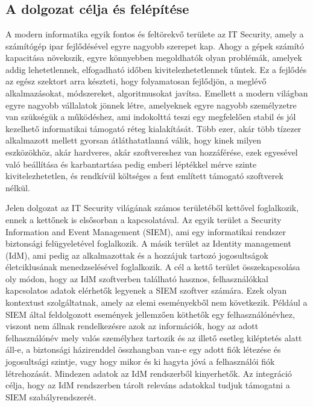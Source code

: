 \chapter{\bevezetes}
\label{ch:bev}
\selecthungarian

\section{A dolgozat célja és felépítése }
A modern informatika egyik fontos és feltörekvő területe az IT Security, amely a számítógép ipar fejlődésével egyre nagyobb szerepet kap. Ahogy a gépek számító kapacitása növekszik, egyre könnyebben megoldhatók olyan problémák, amelyek addig lehetetlennek, elfogadható időben kivitelezhetetlennek tűntek. Ez a fejlődés az egész szektort arra készteti, hogy folyamatosan fejlődjön, a meglévő alkalmazásokat, módszereket, algoritmusokat javítsa. Emellett a modern világban egyre nagyobb vállalatok jönnek létre, amelyeknek egyre nagyobb személyzetre van szükségük a működéshez, ami indokolttá teszi egy megfelelően stabil és jól kezelhető informatikai támogató réteg kialakítását. Több ezer, akár több tízezer alkalmazott mellett gyorsan átláthatatlanná válik, hogy kinek milyen eszközökhöz, akár hardveres, akár szoftvereshez van hozzáférése, ezek egyesével való beállítása és karbantartása pedig emberi léptékkel mérve szinte kivitelezhetetlen, és rendkívül költséges a fent említett támogató szoftverek nélkül.

 Jelen dolgozat az IT Security világának számos területéből kettővel foglalkozik, ennek a kettőnek is elsősorban a kapcsolatával. Az egyik terület a Security Information and Event Management (SIEM), ami egy informatikai rendszer biztonsági felügyeletével foglalkozik. A másik terület az Identity management (IdM), ami pedig az alkalmazottak és a hozzájuk tartozó jogosultságok életciklusának menedzselésével foglalkozik. A cél a kettő terület összekapcsolása oly módon, hogy az IdM szoftverben található hasznos, felhasználókkal kapcsolatos adatok elérhetők legyenek a SIEM szoftver számára. Ezek olyan kontextust szolgáltatnak, amely az elemi eseményekből nem következik. Például a SIEM által feldolgozott események jellemzően köthetők egy felhasználónévhez, viszont nem állnak rendelkezésre azok az információk, hogy az adott felhasználónév mely valós személyhez tartozik és az illető esetleg kiléptetés alatt áll-e, a biztonsági házirenddel összhangban van-e egy adott fiók létezése és jogosultsági szintje, vagy hogy mikor és ki hagyta jóvá a felhasználói fiók létrehozását. Mindezen adatok az IdM rendszerből kinyerhetők. Az integráció célja, hogy az IdM rendszerben tárolt releváns adatokkal tudjuk támogatni a SIEM szabályrendszerét.

